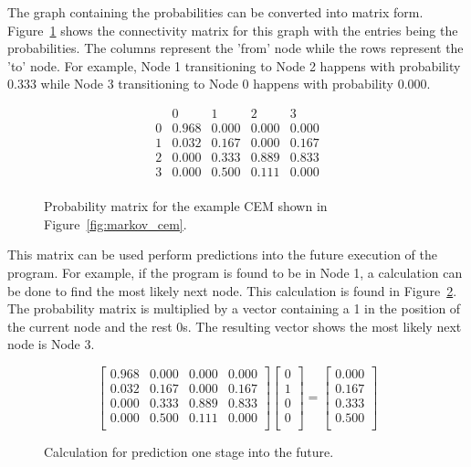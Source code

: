 The graph containing the probabilities can be converted into matrix
form.  Figure~\ref{fig:markov_prob_mat} shows the connectivity matrix
for this graph with the entries being the probabilities.
The columns represent the 'from' node while the rows
represent the 'to' node.  For example, Node 1 transitioning to Node 2
happens with probability 0.333 while Node 3 transitioning to Node 0
happens with probability 0.000.

\begin{figure}[t!]
\centering
\[
\begin{array}{c|cccc}
      & 0     & 1     & 2     & 3     \\
\hline
    0 & 0.968 & 0.000 & 0.000 & 0.000 \\
    1 & 0.032 & 0.167 & 0.000 & 0.167 \\
    2 & 0.000 & 0.333 & 0.889 & 0.833 \\
    3 & 0.000 & 0.500 & 0.111 & 0.000 \\
\end{array}
\]
\caption{Probability matrix for the example CEM shown in
Figure~\ref{fig:markov_cem}.}
\label{fig:markov_prob_mat}
\end{figure}

This matrix can be used perform predictions into the future execution
of the program. For example, if the program is found to be in Node 1,
a calculation can be done to find the most likely next node. This
calculation is found in Figure~\ref{fig:markov_pred_one_stage}. The
probability matrix is multiplied by a vector containing a 1 in the
position of the current node and the rest 0s. The resulting vector
shows the most likely next node is Node 3.

\begin{figure}[b!]
\centering
\[
\begin{bmatrix}
    0.968 & 0.000 & 0.000 & 0.000 \\
    0.032 & 0.167 & 0.000 & 0.167 \\
    0.000 & 0.333 & 0.889 & 0.833 \\
    0.000 & 0.500 & 0.111 & 0.000 \\
\end{bmatrix}
\begin{bmatrix}
    0 \\
    1 \\
    0 \\
    0 \\
\end{bmatrix}
=
\begin{bmatrix}
    0.000 \\
    0.167 \\
    0.333 \\
    0.500 \\
\end{bmatrix}
\]
\caption{Calculation for prediction one stage into the future.}
\label{fig:markov_pred_one_stage}
\end{figure}

